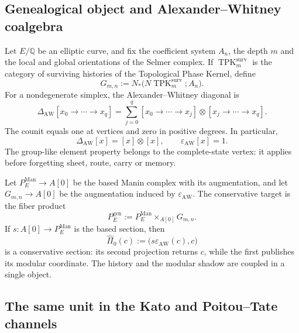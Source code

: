 \subsection*{Genealogical object and Alexander--Whitney coalgebra}

Let \(E/\mathbb Q\) be an elliptic curve, and fix the coefficient system
\(A_n\), the depth \(m\) and the local and global orientations of the
Selmer complex. If
\(\operatorname{TPK}^{\mathrm{surv}}_{m}\) is the category of surviving
histories of the Topological Phase Kernel, define
\begin{equation}\label{eq:bsd-suc-gmn}
 G_{m,n}:=
 N_{*}\bigl(N\operatorname{TPK}^{\mathrm{surv}}_{m};A_n\bigr).
\end{equation}
For a nondegenerate simplex, the Alexander--Whitney diagonal is
\begin{equation}\label{eq:bsd-suc-aw}
 \Delta_{\mathrm{AW}}[x_0\to\cdots\to x_q]
 =\sum_{j=0}^{q}
 [x_0\to\cdots\to x_j]\otimes
 [x_j\to\cdots\to x_q].
\end{equation}
The counit equals one at vertices and zero in positive degrees. In
particular,
\begin{equation}\label{eq:bsd-suc-group-like}
 \Delta_{\mathrm{AW}}[x]=[x]\otimes[x],
 \qquad \varepsilon_{\mathrm{AW}}[x]=1.
\end{equation}
The group-like element property belongs to the complete-state vertex: it applies
before forgetting sheet, route, carry or memory.

Let \(P_E^{\mathrm{Man}}\to A[0]\) be the based Manin complex with its
augmentation, and let \(G_{m,n}\to A[0]\) be the augmentation induced by
\(\varepsilon_{\mathrm{AW}}\). The conservative target is the fiber
product
\begin{equation}\label{eq:bsd-suc-pullback}
 P_E^{\mathrm{gen}}
 :=P_E^{\mathrm{Man}}\times_{A[0]}G_{m,n}.
\end{equation}
If \(s:A[0]\to P_E^{\mathrm{Man}}\) is the based section, then
\begin{equation}\label{eq:bsd-suc-section}
 \widehat\Pi_0(c)
 :=\bigl(s\varepsilon_{\mathrm{AW}}(c),c\bigr)
\end{equation}
is a conservative section: its second projection returns \(c\), while
the first publishes its modular coordinate. The history and the modular shadow
are coupled in a single object.

\subsection*{The same unit in the Kato and Poitou--Tate channels}

